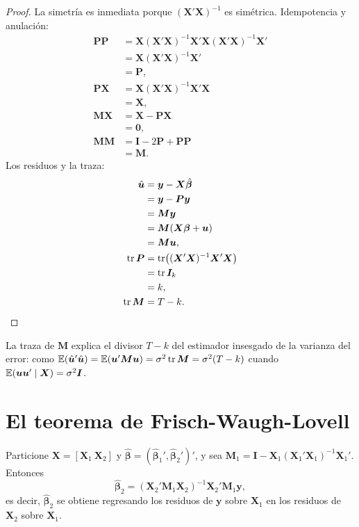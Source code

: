 \begin{proof}
La simetría es inmediata porque $(\bm X'\bm X)^{-1}$ es simétrica. Idempotencia y anulación:
\begin{align*}
  \bm P\bm P &= \bm X(\bm X'\bm X)^{-1}\bm X'\bm X(\bm X'\bm X)^{-1}\bm X'\\
             &= \bm X(\bm X'\bm X)^{-1}\bm X'\\
             &= \bm P,\\
  \bm P\bm X &= \bm X(\bm X'\bm X)^{-1}\bm X'\bm X\\
             &= \bm X,\\
  \bm M\bm X &= \bm X-\bm P\bm X\\
             &= \bm 0,\\
  \bm M\bm M &= \bm I-2\bm P+\bm P\bm P\\
             &= \bm M .
\end{align*}
Los residuos y la traza:
\begin{align*}
  \hat{\bm u} &= \bm y-\bm X\hat{\bm\beta}\\
              &= \bm y-\bm P\bm y\\
              &= \bm M\bm y\\
              &= \bm M(\bm X\bm\beta+\bm u)\\
              &= \bm M\bm u,\\
  \operatorname{tr}\bm P &= \operatorname{tr}\bigl((\bm X'\bm X)^{-1}\bm X'\bm X\bigr)\\
                         &= \operatorname{tr}\bm I_k\\
                         &= k,\\
  \operatorname{tr}\bm M &= T-k. \qedhere
\end{align*}
\end{proof}

La traza de $\bm M$ explica el divisor $T-k$ del estimador insesgado de la varianza del error: como
$\mathbb{E}(\hat{\bm u}'\hat{\bm u})=\mathbb{E}(\bm u'\bm M\bm u)=\sigma^2\operatorname{tr}\bm M=\sigma^2(T-k)$ cuando
$\mathbb{E}(\bm u\bm u'\mid\bm X)=\sigma^2\bm I$.

\section{El teorema de Frisch-Waugh-Lovell}

\begin{teorema}\label{teo:ap-fwl}
Particione $\bm X=[\bm X_1\ \bm X_2]$ y $\hat{\bm\beta}=(\hat{\bm\beta}_1',\hat{\bm\beta}_2')'$, y sea
$\bm M_1=\bm I-\bm X_1(\bm X_1'\bm X_1)^{-1}\bm X_1'$. Entonces
\[
  \hat{\bm\beta}_2=(\bm X_2'\bm M_1\bm X_2)^{-1}\bm X_2'\bm M_1\bm y,
\]
es decir, $\hat{\bm\beta}_2$ se obtiene regresando los residuos de $\bm y$ sobre $\bm X_1$ en los
residuos de $\bm X_2$ sobre $\bm X_1$.
\end{teorema}

